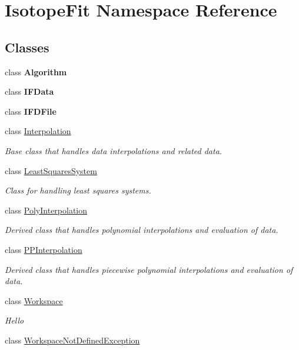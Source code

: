 \hypertarget{namespace_isotope_fit}{}\section{Isotope\+Fit Namespace Reference}
\label{namespace_isotope_fit}
\subsection*{Classes}
\begin{DoxyCompactItemize}
\item 
class {\bfseries Algorithm}
\item 
class {\bfseries I\+F\+Data}
\item 
class {\bfseries I\+F\+D\+File}
\item 
class \hyperlink{class_isotope_fit_1_1_interpolation}{Interpolation}
\begin{DoxyCompactList}\small\item\em Base class that handles data interpolations and related data. \end{DoxyCompactList}\item 
class \hyperlink{class_isotope_fit_1_1_least_squares_system}{Least\+Squares\+System}
\begin{DoxyCompactList}\small\item\em Class for handling least squares systems. \end{DoxyCompactList}\item 
class \hyperlink{class_isotope_fit_1_1_poly_interpolation}{Poly\+Interpolation}
\begin{DoxyCompactList}\small\item\em Derived class that handles polynomial interpolations and evaluation of data. \end{DoxyCompactList}\item 
class \hyperlink{class_isotope_fit_1_1_p_p_interpolation}{P\+P\+Interpolation}
\begin{DoxyCompactList}\small\item\em Derived class that handles piecewise polynomial interpolations and evaluation of data. \end{DoxyCompactList}\item 
class \hyperlink{class_isotope_fit_1_1_workspace}{Workspace}
\begin{DoxyCompactList}\small\item\em Hello \end{DoxyCompactList}\item 
class \hyperlink{class_isotope_fit_1_1_workspace_not_defined_exception}{Workspace\+Not\+Defined\+Exception}
\end{DoxyCompactItemize}
